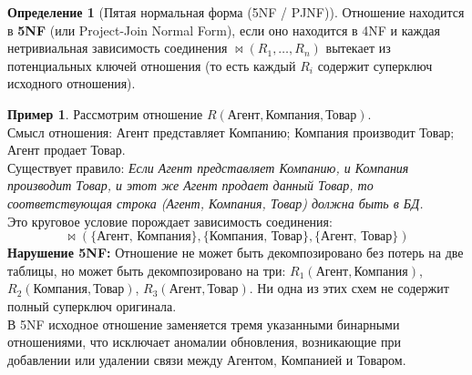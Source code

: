 \documentclass[12pt,a4paper]{article}
\theoremstyle{definition}
\newtheorem{definition}{Определение}
\newtheorem{example}{Пример}
\theoremstyle{plain}
\begin{document}
\begin{definition}[Пятая нормальная форма (5NF / PJNF)]
Отношение находится в \textbf{5NF} (или Project-Join Normal Form), если оно находится в 4NF и каждая нетривиальная зависимость соединения $\bowtie(R_1, \dots, R_n)$ вытекает из потенциальных ключей отношения (то есть каждый $R_i$ содержит суперключ исходного отношения).
\end{definition}

\begin{example}
Рассмотрим отношение $R(\text{Агент}, \text{Компания}, \text{Товар})$. \\
Смысл отношения: Агент представляет Компанию; Компания производит Товар; Агент продает Товар. \\
Существует правило: \textit{Если Агент представляет Компанию, и Компания производит Товар, и этот же Агент продает данный Товар, то соответствующая строка (Агент, Компания, Товар) должна быть в БД.} \\
Это круговое условие порождает зависимость соединения:
$$\bowtie(\{\text{Агент, Компания}\}, \{\text{Компания, Товар}\}, \{\text{Агент, Товар}\})$$
\textbf{Нарушение 5NF:} Отношение не может быть декомпозировано без потерь на две таблицы, но может быть декомпозировано на три: $R_1(\text{Агент}, \text{Компания})$, $R_2(\text{Компания}, \text{Товар})$, $R_3(\text{Агент}, \text{Товар})$. Ни одна из этих схем не содержит полный суперключ оригинала. \\
В 5NF исходное отношение заменяется тремя указанными бинарными отношениями, что исключает аномалии обновления, возникающие при добавлении или удалении связи между Агентом, Компанией и Товаром.
\end{example}
\end{document}
